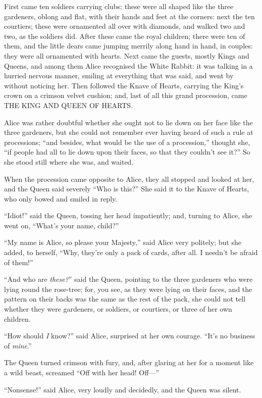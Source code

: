 \documentclass[book, 20pt]{extbook}
\begin{document}
First came ten soldiers carrying clubs; these were all shaped like the
three gardeners, oblong and flat, with their hands and feet at the
corners: next the ten courtiers; these were ornamented all over with
diamonds, and walked two and two, as the soldiers did. After these came
the royal children; there were ten of them, and the little dears came
jumping merrily along hand in hand, in couples: they were all ornamented
with hearts. Next came the guests, mostly Kings and Queens, and among
them Alice recognised the White Rabbit: it was talking in a hurried
nervous manner, smiling at everything that was said, and went by without
noticing her. Then followed the Knave of Hearts, carrying the King's
crown on a crimson velvet cushion; and, last of all this grand
procession, came THE KING AND QUEEN OF HEARTS.

Alice was rather doubtful whether she ought not to lie down on her face
like the three gardeners, but she could not remember ever having heard
of such a rule at processions; ``and besides, what would be the use of a
procession,'' thought she, ``if people had all to lie down upon their
faces, so that they couldn't see it?'' So she stood still where she was,
and waited.

When the procession came opposite to Alice, they all stopped and looked
at her, and the Queen said severely ``Who is this?'' She said it to the
Knave of Hearts, who only bowed and smiled in reply.

``Idiot!'' said the Queen, tossing her head impatiently; and, turning to
Alice, she went on, ``What's your name, child?''

``My name is Alice, so please your Majesty,'' said Alice very politely;
but she added, to herself, ``Why, they're only a pack of cards, after
all. I needn't be afraid of them!''

``And who are \emph{these?}'' said the Queen, pointing to the three
gardeners who were lying round the rose-tree; for, you see, as they were
lying on their faces, and the pattern on their backs was the same as the
rest of the pack, she could not tell whether they were gardeners, or
soldiers, or courtiers, or three of her own children.

``How should \emph{I} know?'' said Alice, surprised at her own courage.
``It's no business of \emph{mine}.''

The Queen turned crimson with fury, and, after glaring at her for a
moment like a wild beast, screamed ``Off with her head! Off---''

``Nonsense!'' said Alice, very loudly and decidedly, and the Queen was
silent.
\end{document}

